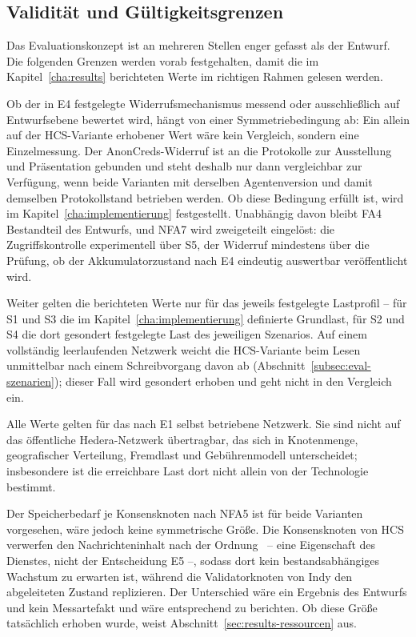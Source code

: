 \subsection{Validität und Gültigkeitsgrenzen}
\label{subsec:eval-validitaet}

Das Evaluationskonzept ist an mehreren Stellen enger gefasst als der Entwurf. Die folgenden Grenzen werden vorab festgehalten, damit die im Kapitel~\ref{cha:results} berichteten Werte im richtigen Rahmen gelesen werden.

Ob der in E4 festgelegte Widerrufsmechanismus messend oder ausschließlich auf Entwurfsebene bewertet wird, hängt von einer Symmetriebedingung ab: Ein allein auf der HCS-Variante erhobener Wert wäre kein Vergleich, sondern eine Einzelmessung. Der AnonCreds-Widerruf ist an die Protokolle zur Ausstellung und Präsentation gebunden und steht deshalb nur dann vergleichbar zur Verfügung, wenn beide Varianten mit derselben Agentenversion und damit demselben Protokollstand betrieben werden. Ob diese Bedingung erfüllt ist, wird im Kapitel~\ref{cha:implementierung} festgestellt. Unabhängig davon bleibt FA4 Bestandteil des Entwurfs, und NFA7 wird zweigeteilt eingelöst: die Zugriffskontrolle experimentell über S5, der Widerruf mindestens über die Prüfung, ob der Akkumulatorzustand nach E4 eindeutig auswertbar veröffentlicht wird.

Weiter gelten die berichteten Werte nur für das jeweils festgelegte Lastprofil -- für S1 und S3 die im Kapitel~\ref{cha:implementierung} definierte Grundlast, für S2 und S4 die dort gesondert festgelegte Last des jeweiligen Szenarios. Auf einem vollständig leerlaufenden Netzwerk weicht die HCS-Variante beim Lesen unmittelbar nach einem Schreibvorgang davon ab (Abschnitt~\ref{subsec:eval-szenarien}); dieser Fall wird gesondert erhoben und geht nicht in den Vergleich ein.

Alle Werte gelten für das nach E1 selbst betriebene Netzwerk. Sie sind nicht auf das öffentliche Hedera-Netzwerk übertragbar, das sich in Knotenmenge, geografischer Verteilung, Fremdlast und Gebührenmodell unterscheidet; insbesondere ist die erreichbare Last dort nicht allein von der Technologie bestimmt.

Der Speicherbedarf je Konsensknoten nach NFA5 ist für beide Varianten vorgesehen, wäre jedoch keine symmetrische Größe. Die Konsensknoten von HCS verwerfen den Nachrichteninhalt nach der Ordnung~\cite{bairdgross2019} -- eine Eigenschaft des Dienstes, nicht der Entscheidung E5 --, sodass dort kein bestandsabhängiges Wachstum zu erwarten ist, während die Validatorknoten von Indy den abgeleiteten Zustand replizieren. Der Unterschied wäre ein Ergebnis des Entwurfs und kein Messartefakt und wäre entsprechend zu berichten. Ob diese Größe tatsächlich erhoben wurde, weist Abschnitt~\ref{sec:results-ressourcen} aus.

